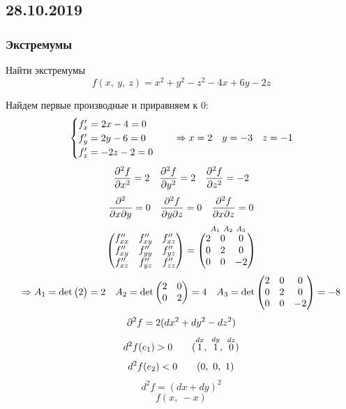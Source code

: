 \documentclass[12pt, fleqn]{article}
\begin{document}
\subsection{28.10.2019}
\subsubsection{Экстремумы}

\begin{example}
  Найти экстремумы
  \[f(x,\ y,\ z) = x^2 + y^2 - z^2 - 4x + 6y - 2z\]
\end{example}

\begin{sol}
  Найдем первые производные и приравняем к 0:
  \[\begin{cases}
    f'_x = 2x - 4 = 0\\
    f'_y = 2y - 6 = 0\\
    f'_z = - 2z - 2 = 0
  \end{cases} \quad \Rightarrow x = 2 \quad y = -3 \quad z = -1\]
  \[\dfrac{\partial^2 f}{\partial x^2} = 2 \quad \dfrac{\partial^2 f}{\partial y^2} = 2 \quad \dfrac{\partial^2 f}{\partial z^2} = - 2\]
  \[\dfrac{\partial^2 }{\partial x \partial y} = 0 \quad \dfrac{\partial^2 f}{\partial y \partial z} = 0 \quad \dfrac{\partial^2 f}{\partial x \partial z} = 0\]
  \[\begin{pmatrix}
    f''_{xx} & f''_{xy} & f''_{xz}\\
    f''_{xy} & f''_{yy} & f''_{yz}\\
    f''_{xz} & f''_{yz} & f''_{zz}
\end{pmatrix} = \overset{\ A_1 \ A_2 \ A_3}{\begin{pmatrix}
    2 & 0 & 0\\
    0 & 2 & 0\\
    0 & 0 & -2
  \end{pmatrix}}\]
  \[\Rightarrow A_1 = \det \begin{pmatrix}
    2
  \end{pmatrix} = 2 \quad A_2 = \det \begin{pmatrix}
    2 & 0\\
    0 & 2
  \end{pmatrix} = 4 \quad A_3 = \det \begin{pmatrix}
    2 & 0 & 0\\
    0 & 2 & 0\\
    0 & 0 & -2
  \end{pmatrix} = -8\]
  \[\partial^2 f = 2 (d x^2 + dy^2 - dz^2)\]
  \[d^2 f (e_1) > 0 \qquad (\overset{dx}{1},\ \overset{dy}{1},\ \overset{dz}{0})\]
  \[d^2 f (e_2) < 0 \qquad (0,\ 0,\ 1)\]
  \[d^2 f = (dx + dy)^2\]
  \[f(x,\ -x)\]
\end{sol}
\end{document}
